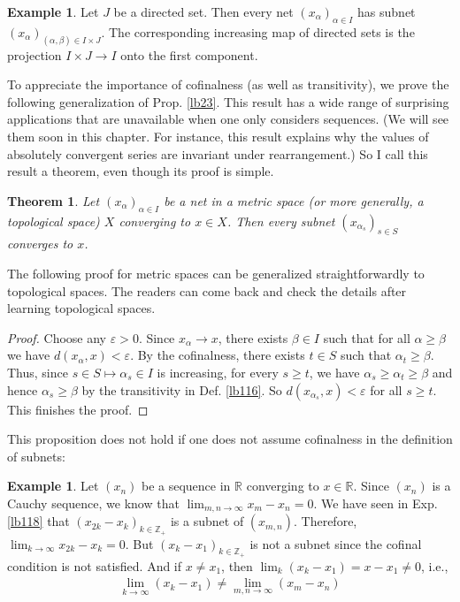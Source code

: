 \documentclass[12pt,b5paper,notitlepage]{article}
\theoremstyle{definition}
\newtheorem{eg}[df]{Example}
\theoremstyle{plain}
\newtheorem{thm}[df]{Theorem}
\newcommand{\Zbb}{\mathbb Z}
\newcommand{\Rbb}{\mathbb R}
\newcommand{\eps}{\varepsilon}
\numberwithin{equation}{section}
\begin{document}
\begin{eg}\label{lb124}
Let $J$ be a directed set. Then every net $(x_\alpha)_{\alpha\in I}$ has subnet $(x_\alpha)_{(\alpha,\beta)\in I\times J}$. The corresponding increasing map of directed sets is the projection $I\times J\rightarrow I$ onto the first component. 
\end{eg}






To appreciate the importance of cofinalness (as well as transitivity), we prove the following generalization of Prop. \ref{lb23}. This result has a wide range of surprising applications that are unavailable when one only considers sequences. (We will see them soon in this chapter. For instance, this result explains why the values of absolutely convergent series are invariant under rearrangement.) So I call this result a theorem, even though its proof is simple.


\begin{thm}\label{lb120}
Let $(x_\alpha)_{\alpha\in I}$ be a net in a metric space (or more generally, a topological space) $X$ converging to $x\in X$. Then every subnet $(x_{\alpha_s})_{s\in S}$ converges to $x$.
\end{thm}

The following proof for metric spaces can be generalized straightforwardly to topological spaces. The readers can come back and check the details after learning topological spaces.

\begin{proof}
Choose any $\eps>0$. Since $x_\alpha\rightarrow x$, there exists $\beta\in I$ such that for all $\alpha\geq\beta$ we have $d(x_\alpha,x)<\eps$. By the cofinalness, there exists $t\in S$ such that $\alpha_t\geq\beta$. Thus, since $s\in S\mapsto \alpha_s\in I$ is increasing, for every $s\geq t$, we have $\alpha_s\geq\alpha_t\geq\beta$ and hence $\alpha_s\geq\beta$ by the transitivity in Def. \ref{lb116}. So $d(x_{\alpha_s},x)<\eps$ for all $s\geq t$. This finishes the proof.
\end{proof}

This proposition does not hold if one does not assume cofinalness in the definition of subnets:

\begin{eg}
Let $(x_n)$ be a sequence in $\Rbb$ converging to $x\in\Rbb$. Since $(x_n)$ is a Cauchy sequence, we know that $\lim_{m,n\rightarrow\infty}x_m-x_n=0$. We have seen in Exp. \ref{lb118} that $(x_{2k}-x_k)_{k\in\Zbb_+}$ is a subnet of $(x_{m,n})$. Therefore, $\lim_{k\rightarrow\infty} x_{2k}-x_k=0$. But $(x_k-x_1)_{k\in\Zbb_+}$ is not a subnet since the cofinal condition is not satisfied. And if $x\neq x_1$, then $\lim_k (x_k-x_1)=x-x_1\neq 0$, i.e.,
\begin{align*}
\lim_{k\rightarrow\infty}(x_k-x_1)\neq \lim_{m,n\rightarrow\infty} (x_m-x_n)
\end{align*}
\end{eg}
\end{document}

